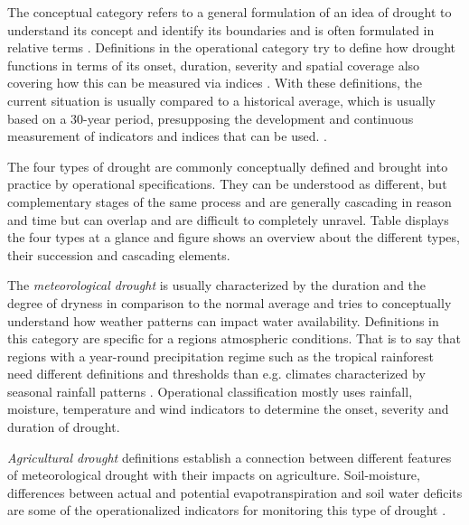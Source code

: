 The conceptual category refers to a general formulation of an idea of drought to understand its concept and identify its boundaries and is often formulated in relative terms \autocite{wilhiteUnderstandingDroughtPhenomenon1985}. Definitions in the operational category try to define how drought functions in terms of its onset, duration, severity and spatial coverage also covering how this can be measured via indices \autocite{balintMonitoringDroughtCombined2013, nationaldroughtmitigationcenterWhatDrought, wilhiteUnderstandingDroughtPhenomenon1985}. With these definitions, the current situation is usually compared to a historical average, which is usually based on a 30-year period, presupposing the development and continuous measurement of indicators and indices that can be used. \autocite{vereintenationenSpecialReportDrought2021,wilhiteUnderstandingDroughtPhenomenon1985}.

The four types of drought are commonly conceptually defined and brought into practice by operational specifications. They can be understood as different, but complementary stages of the same process and are generally cascading in reason and time but can overlap and are difficult to completely unravel. Table  displays the four types at a glance and figure  shows an overview about the different types, their succession and cascading elements.


The \textit{meteorological drought} is usually characterized by the duration and the degree of dryness in comparison to the normal average and tries to conceptually understand how weather patterns can impact water availability. Definitions in this category are specific for a regions atmospheric conditions. That is to say that regions with a year-round precipitation regime such as the tropical rainforest need different definitions and thresholds than e.g. climates characterized by seasonal rainfall patterns \autocite{ndmcTypesDrought2023}. Operational classification mostly uses rainfall, moisture, temperature and wind indicators to determine the onset, severity and duration of drought.

\textit{Agricultural drought} definitions establish a connection between different features of meteorological drought with their impacts on agriculture. Soil-moisture, differences between actual and potential evapotranspiration and soil water deficits are some of the operationalized indicators for monitoring this type of drought \autocite{baltiReviewDroughtMonitoring2020,ndmcTypesDrought2023,wilhiteUnderstandingDroughtPhenomenon1985}.

